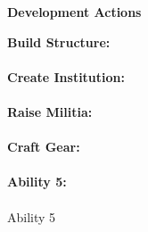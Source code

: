 \documentclass[12pt]{extarticle}
\begin{document}
    \newpage
    \begin{center}\huge \textbf{Development Actions} \end{center}
    \large \textbf{Build Structure:}
    \small\paragraph{}\par
    \bigskip
    \noindent\large \textbf{Create Institution:}
    \small\paragraph{}\par
    \bigskip
    \noindent\large \textbf{Raise Militia:}
    \small\paragraph{}\par
    \bigskip
    \noindent\large \textbf{Craft Gear:}
    \small\paragraph{}\par
    \bigskip
    \noindent\large \textbf{Ability 5:}
    \small\paragraph{}Ability 5\par
    \bigskip
\end{document}
